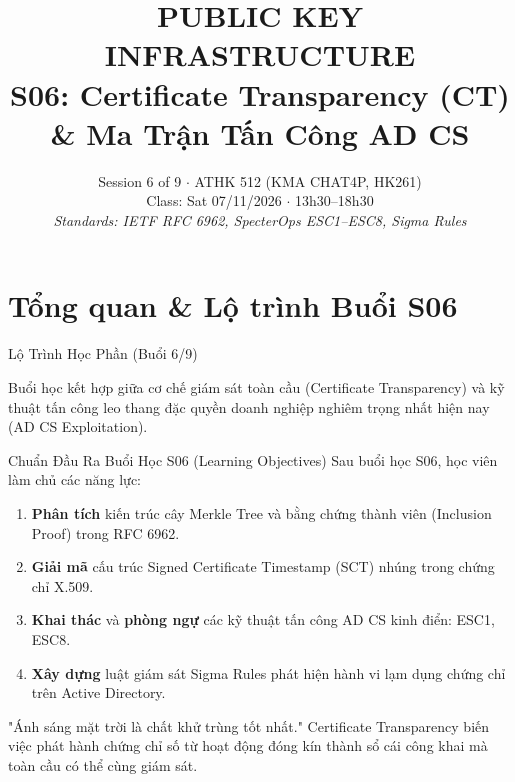 
\title{\color{hcmutblue}\textbf{\LARGE PUBLIC KEY INFRASTRUCTURE}\\[0.25em]
       \color{hcmutblue}\textbf{\large S06: Certificate Transparency (CT) \& Ma Trận Tấn Công AD CS}}
\date{\footnotesize Session 6 of 9 $\cdot$ ATHK 512 (KMA CHAT4P, HK261)\\
      Class: Sat 07/11/2026 $\cdot$ 13h30--18h30\\
      \textit{Standards: IETF RFC 6962, SpecterOps ESC1--ESC8, Sigma Rules}}


\PKItitleframe

\section{Tổng quan \& Lộ trình Buổi S06}

\begin{frame}{Lộ Trình Học Phần (Buổi 6/9)}
  \centering
  \vspace{0.4em}
  \raggedright\small
  Buổi học kết hợp giữa cơ chế giám sát toàn cầu (Certificate Transparency) và kỹ thuật tấn công leo thang đặc quyền doanh nghiệp nghiêm trọng nhất hiện nay (AD CS Exploitation).
\end{frame}

\begin{frame}{Chuẩn Đầu Ra Buổi Học S06 (Learning Objectives)}
  \small
  Sau buổi học S06, học viên làm chủ các năng lực:
  \begin{enumerate}
    \item \textbf{Phân tích} kiến trúc cây Merkle Tree và bằng chứng thành viên (Inclusion Proof) trong RFC 6962.
    \item \textbf{Giải mã} cấu trúc Signed Certificate Timestamp (SCT) nhúng trong chứng chỉ X.509.
    \item \textbf{Khai thác} và \textbf{phòng ngự} các kỹ thuật tấn công AD CS kinh điển: ESC1, ESC8.
    \item \textbf{Xây dựng} luật giám sát Sigma Rules phát hiện hành vi lạm dụng chứng chỉ trên Active Directory.
  \end{enumerate}

  \begin{keybox}
    "Ánh sáng mặt trời là chất khử trùng tốt nhất." Certificate Transparency biến việc phát hành chứng chỉ số từ hoạt động đóng kín thành sổ cái công khai mà toàn cầu có thể cùng giám sát.
  \end{keybox}
\end{frame}

